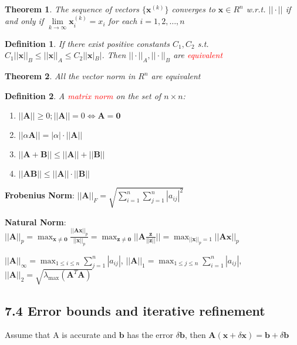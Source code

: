 \documentclass[11pt]{article}
\newtheorem{theorem}{Theorem}[section]
\newtheorem{definition}{Definition}[section]
\newcommand{\bl}[1] {\boldsymbol{#1}}
\begin{document}
\begin{theorem}
The sequence of vectors $\{\mathbf{x}^{(k)}\}$ converges to $ \mathbf{x}\in R^n$
w.r.t. $||\cdot||$ if and only if $ \lim\limits_{k\to\infty}\mathbf{x}^{(k)}_i=x_i$
for each $i=1,2,\dots,n$
\end{theorem}

\begin{definition}
If there exist positive constants $C_1,C_2$ s.t. $C_1||\mathbf{x}||_B\le||\mathbf{x}||_A
\le C_2||\mathbf{x}|_B|$. Then $||\cdot||_A,||\cdot||_B$ are \textcolor{red}{equivalent} 
\end{definition}

\begin{theorem}
All the vector norm in $R^n$ are equivalent
\end{theorem}


\begin{definition}
A \textcolor{red}{matrix norm} on the set of $n\times n$:
\begin{enumerate}
\item $||\mathbf{A}||\ge0;||\mathbf{A}||=0\Longleftrightarrow \mathbf{A}=\mathbf{0}$
\item $||\alpha \mathbf{A}||=|\alpha|\cdot||\mathbf{A}||$
\item $||\mathbf{A}+\mathbf{B}||\le||\mathbf{A}||+||\mathbf{B}||$
\item $||\mathbf{AB}||\le||\mathbf{A}||\cdot||\mathbf{B}||$
\end{enumerate}
\end{definition}

\textbf{Frobenius Norm}: \(||\mathbf{A}||_F=\sqrt{\displaystyle\sum_{i=1}^n
   \displaystyle\sum_{j=1}^n|a_{ij}|^2}\)

\textbf{Natural Norm}: \(||\mathbf{A}||_p=\displaystyle\max_{\mathbf{x}\neq
   \mathbf{0}}\frac{||\mathbf{Ax}||_p}{||\mathbf{x}||_p}=\displaystyle\max_{\mathbf{z}\neq
   \mathbf{0}}||\mathbf{A}\frac{\mathbf{z}}{||\mathbf{z}||}||=\displaystyle\max_{||\mathbf{x}||_p=1}||\mathbf{Ax}||_p\)

\(||\mathbf{A}||_\infty=\displaystyle\max_{1\le i\le n}\displaystyle\sum_{j=1}^n|a_{ij}|\),
\(||\mathbf{A}||_1=\displaystyle\max_{1\le j\le n}\displaystyle\sum_{i=1}^n|a_{ij}|\),
\(||\mathbf{A}||_2=\sqrt{\lambda_\text{max}(\mathbf{A}^T \mathbf{A})}\)
\subsection{7.4 Error bounds and iterative refinement}
\label{sec:org3a1e900}
Assume that A is accurate and \(\bl{b}\) has the error \(\delta \bl{b}\),
then \(\bl{A}(\bl{x}+\delta \bl{x})=\bl{b}+\delta \bl{b}\)
\end{document}
